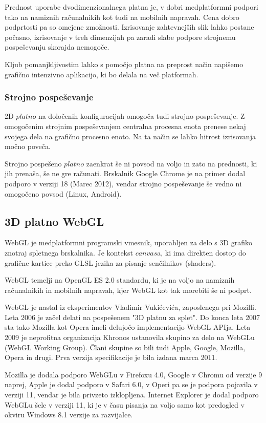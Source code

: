 Prednost uporabe dvodimenzionalnega platna je, v dobri medplatformni podpori tako na namiznih računalnikih kot tudi na mobilnih napravah. Cena dobro podprtosti pa so omejene zmožnosti. Izrisovanje zahtevnejših slik lahko postane počasno, izrisovanje v treh dimenzijah pa zaradi slabe podpore strojnemu pospeševanju skorajda nemogoče. 

Kljub pomanjkljivostim lahko s pomočjo platna na preprost način napišemo grafično intenzivno aplikacijo, ki bo delala na več platformah. 

\subsubsection{Strojno pospeševanje}

2D $platno$ na določenih konfiguracijah omogoča tudi strojno pospeševanje. Z omogočenim strojnim pospeševanjem centralna procesna enota prenese nekaj svojega dela na grafično procesno enoto. Na ta način se lahko hitrost izrisovanja močno poveča.

Strojno pospešeno $platno$ zaenkrat še ni povsod na voljo in zato na prednosti, ki jih prenaša, še ne gre računati. Brskalnik Google Chrome je na primer dodal podporo v verziji 18 (Marec 2012), vendar strojno pospeševanje še vedno ni omogočeno povsod (Linux, Android).

\subsection{3D platno WebGL}

WebGL je medplatformni programski vmesnik, uporabljen za delo s 3D grafiko znotraj spletnega brskalnika. Je kontekst $canvas$a, ki ima direkten dostop do grafične kartice preko GLSL jezika za pisanje senčilnikov (shaders). 

WebGL temelji na OpenGL ES 2.0 standardu, ki je na voljo na namiznih računalnikih in mobilnih napravah, kjer WebGL kot tak morebiti še ni podprt.

WebGL je nastal iz eksperimentov Vladimir Vukićevića, zaposlenega pri Mozilli. Leta 2006 je začel delati na pospešenem "3D platnu za splet". Do konca leta 2007 sta tako Mozilla kot Opera imeli delujočo implementacijo WebGL APIja. Leta 2009 je neprofitna organizacija Khronos ustanovila skupino za delo na WebGLu (WebGL Working Group). Člani skupine so bili tudi Apple, Google, Mozilla, Opera in drugi. Prva verzija specifikacije je bila izdana marca 2011.

Mozilla je dodala podporo WebGLu v Firefoxu 4.0, Google v Chromu od verzije 9 naprej, Apple je dodal podporo v Safari 6.0, v Operi pa se je podpora pojavila v verziji 11, vendar je bila privzeto izklopljena. Internet Explorer je dodal podporo WebGLu šele v verziji 11, ki je v času pisanja na voljo samo kot predogled v okviru Windows 8.1 verzije za razvijalce.

